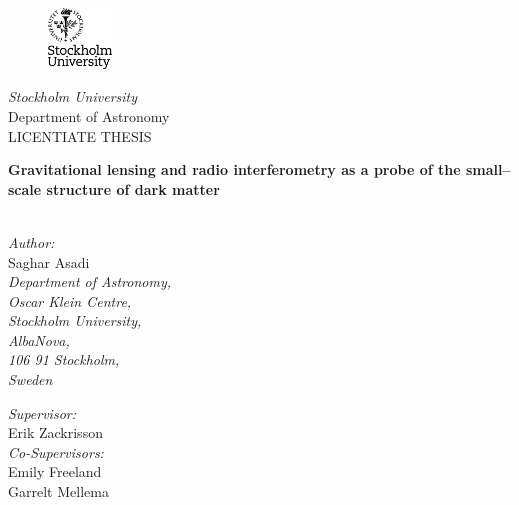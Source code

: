 \documentclass[a4wide,12pt]{book}
\begin{document}
\titlepage
\begin{center}

\begin{figure}[!h]
\vspace{-1.5cm}
\includegraphics[width=0.15\textwidth]{SU-Logga.eps}
\end{figure}
\textit{\Large{Stockholm University}}\\

\Large{Department of Astronomy}\\

\vspace{1.5cm}
\large{LICENTIATE THESIS}\\

\vspace{0.1cm}

{\bf \LARGE{Gravitational lensing and radio interferometry as a probe of the small--scale structure of dark matter\\ \vspace{1.4cm} }}~\\
\end{center}

\vspace{-1.0cm}
\begin{center}
\large{{\it Author:}\\ Saghar Asadi}\\
\vspace{0.5cm}
\small{\it Department of Astronomy,\\ Oscar Klein Centre,\\ Stockholm University,\\ AlbaNova,\\ 106 91 Stockholm,\\ Sweden}

\vspace{1.0cm}
\large{{\it Supervisor:}\\ Erik Zackrisson}\\
\vspace{0.5cm}
\large{{\it Co-Supervisors:}\\ Emily Freeland\\ Garrelt Mellema}\\
\vspace{0.5cm}
\end{center}
\end{document}

